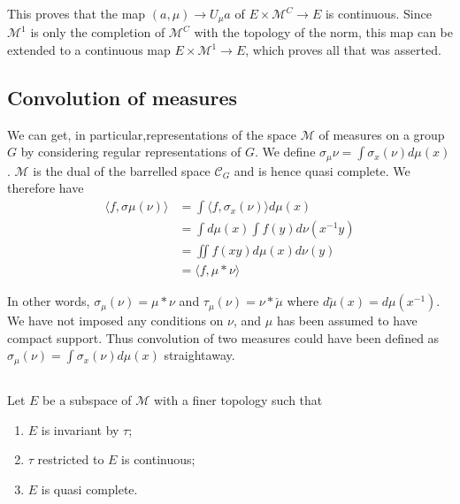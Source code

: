 This proves that the map $(a,\mu)\rightarrow U_{\mu}a$ of $E\times
\mathscr{M}^{C} \rightarrow E$  is continuous. Since $\mathscr{M}^{1}$
is only the 
completion  of $\mathscr{M}^{C}$  with the  topology of the norm, this
map can be 
extended to a continuous map $E \times \mathscr{M}^{1}\rightarrow E$, which
proves all that was asserted. 

\subsection{Convolution of measures}\label{partII-chap4-sec4.5}%

We can get, in particular,representations of the  space $\mathscr{M}$ of
measures on a group $G$ by considering regular representations 
of $G$. We define $\sigma_\mu \nu  = \int
\sigma_{x}(\nu)d\mu(x)$. $\mathscr{M}$ is the  dual of the barrelled
space $\mathscr{C}_{G}$ and is hence quasi complete. We therefore have 
\begin{align*}
\langle f,\sigma\mu(\nu)\rangle  & = \int \langle
f,\sigma_{x}(\nu)\rangle d\mu(x) \\ 
& = \int d\mu(x)\int f(y)d\nu(x^{-1}y)\\
& = \iint f(xy)d\mu(x) d \nu (y)\\
& =  \langle f,\mu * \nu \rangle 
\end{align*}

In other words, $\sigma_{\mu}(\nu) =\mu *\nu$  and $\tau_{\mu}(\nu) =
\nu *\check{\mu}$ 
where $d  \check{\mu} (x)  =  d\mu(x^{-1})$.  We have not imposed
any conditions on $\nu$, and $\mu$ has been assumed to have compact
support. Thus convolution of two measures could have been defined as
$\sigma_\mu (\nu)= \int \sigma_{x}(\nu)d \mu (x)$ straightaway.  

\subsection{}\label{partII-chap4-sec4.6}\pageoriginale

\begin{proposition}%
Let $E$ be a subspace of $\mathscr{M}$ with a finer topology such that 
\begin{enumerate}
\renewcommand{\theenumi}{\alph{enumi}}
\renewcommand{\labelenumi}{\rm(\theenumi)}
\item $E$ is invariant by $\tau$; 

\item  $\tau$ restricted to $E$ is continuous;

\item  $E$ is  quasi complete.
\end{enumerate}
\end{proposition}

